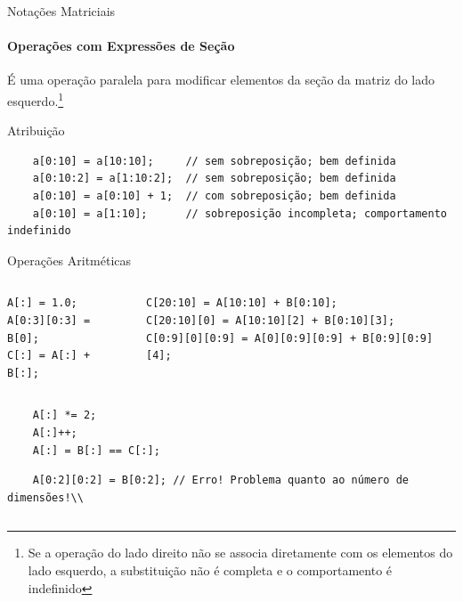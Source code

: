 \documentclass{beamer}
\begin{document}
{
\renewcommand{\footnotesize}{\tiny} 

\begin{frame}[fragile]{Notações Matriciais}
\framesubtitle{Operações com Expressões de Seção}
    É uma operação paralela para modificar elementos da seção da matriz do lado
    esquerdo.\footnote{Se a operação do lado direito não se associa diretamente
    com os elementos do lado esquerdo, a substituição não é completa e o
    comportamento é indefinido}
\begin{tiny}
\begin{block}{Atribuição}
\begin{verbatim}
    a[0:10] = a[10:10];		// sem sobreposição; bem definida
    a[0:10:2] = a[1:10:2];	// sem sobreposição; bem definida
    a[0:10] = a[0:10] + 1;	// com sobreposição; bem definida
    a[0:10] = a[1:10]; 		// sobreposição incompleta; comportamento indefinido
\end{verbatim}
\end{block}
\pause
\begin{block}{Operações Aritméticas}
\begin{columns}
\begin{column}{0.17\textwidth}
\begin{tiny}
\begin{block}{}
\begin{verbatim}
A[:] = 1.0;	
A[0:3][0:3] = B[0];
C[:] = A[:] + B[:];
\end{verbatim}
\end{block}
\end{tiny}
\end{column}
\pause
\begin{column}{0.42\textwidth}
\begin{tiny}
\begin{block}{}
\begin{verbatim}
C[20:10] = A[10:10] + B[0:10];
C[20:10][0] = A[10:10][2] + B[0:10][3];
C[0:9][0][0:9] = A[0][0:9][0:9] + B[0:9][0:9][4];
\end{verbatim}
\end{block}
\end{tiny}
\end{column}
\end{columns}
\pause
\begin{columns}
\begin{column}{0.75\textwidth}
\begin{tiny}
\begin{block}{}
\begin{verbatim}
    A[:] *= 2;
    A[:]++;
    A[:] = B[:] == C[:];
\end{verbatim}
\pause
\begin{verbatim}
    A[0:2][0:2] = B[0:2]; // Erro! Problema quanto ao número de dimensões!\\
\end{verbatim}
\end{block}
\end{tiny}
\end{column}
\end{columns}
\end{block}
\end{tiny}
\end{frame}
}
\end{document}
